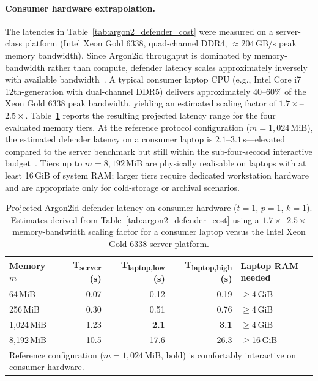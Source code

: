 \documentclass[journal,article,accept,pdftex,moreauthors]{Definitions/mdpi}
\begin{document}
\paragraph{Consumer hardware extrapolation.}
The latencies in Table~\ref{tab:argon2_defender_cost} were measured on a server-class platform (Intel Xeon Gold 6338, quad-channel DDR4, $\approx 204$\,GB/s peak memory bandwidth). Since Argon2id throughput is dominated by memory-bandwidth rather than compute, defender latency scales approximately inversely with available bandwidth~\cite{7467361}. A typical consumer laptop CPU (e.g., Intel Core i7 12th-generation with dual-channel DDR5) delivers approximately 40--60\% of the Xeon Gold 6338 peak bandwidth, yielding an estimated scaling factor of $1.7\times$--$2.5\times$. Table~\ref{tab:argon2_defender_cost_consumer} reports the resulting projected latency range for the four evaluated memory tiers. At the reference protocol configuration ($m=1{,}024$\,MiB), the estimated defender latency on a consumer laptop is $2.1$--$3.1$\,s---elevated compared to the server benchmark but still within the sub-four-second interactive budget~\cite{nielsen1994usability}. Tiers up to $m=8{,}192$\,MiB are physically realisable on laptops with at least 16\,GiB of system RAM; larger tiers require dedicated workstation hardware and are appropriate only for cold-storage or archival scenarios.

\begin{table}[H]
\caption{Projected Argon2id defender latency on consumer hardware ($t=1$, $p=1$, $k=1$). Estimates derived from Table~\ref{tab:argon2_defender_cost} using a $1.7\times$--$2.5\times$ memory-bandwidth scaling factor for a consumer laptop versus the Intel Xeon Gold 6338 server platform.}
\label{tab:argon2_defender_cost_consumer}
\centering
\begin{tabular}{lrrrl}
\toprule
\textbf{Memory $m$} & \textbf{T\textsubscript{server} (s)} & \textbf{T\textsubscript{laptop,low} (s)} & \textbf{T\textsubscript{laptop,high} (s)} & \textbf{Laptop RAM needed} \\
\midrule
64\,MiB   & 0.07  & 0.12 & 0.19 & $\geq$4\,GiB \\
256\,MiB  & 0.30  & 0.51 & 0.76 & $\geq$4\,GiB \\
1{,}024\,MiB & 1.23 & \textbf{2.1} & \textbf{3.1} & $\geq$4\,GiB \\
8{,}192\,MiB & 10.5 & 17.6 & 26.3 & $\geq$16\,GiB \\
\bottomrule
\multicolumn{5}{l}{\footnotesize Reference configuration ($m=1{,}024$\,MiB, bold) is comfortably interactive on consumer hardware.}
\end{tabular}
\end{table}
\end{document}
